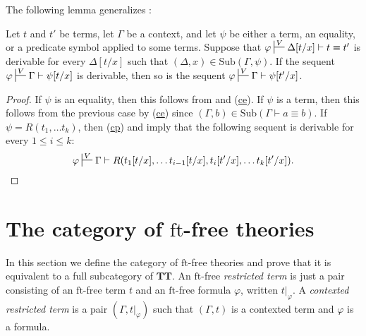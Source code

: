 \documentclass[reqno]{amsart}
\newcommand{\axref}[1]{(\hyperref[ax:#1]{#1})}
\theoremstyle{definition}
\theoremstyle{remark}
\newcommand{\fs}[1]{\mathrm{#1}}
\newcommand{\ft}{\fs{ft}}
\newcommand{\sub}{\fs{Sub}}
\newcommand{\cat}[1]{\mathbf{#1}}
\newcommand{\algtt}{\cat{TT}}
\numberwithin{figure}{section}
\begin{document}
The following lemma generalizes :

\begin{lem}
Let $t$ and $t'$ be terms, let $\Gamma$ be a context, and let $\psi$ be either a term, an equality, or a predicate symbol applied to some terms.
Suppose that $\varphi \sststile{}{V} \Delta[t/x] \vdash t \equiv t'$ is derivable for every $\Delta[t/x]$ such that $(\Delta,x) \in \sub(\Gamma,\psi)$.
If the sequent $\varphi \sststile{}{V} \Gamma \vdash \psi[t/x]$ is derivable, then so is the sequent $\varphi \sststile{}{V} \Gamma \vdash \psi[t'/x]$.
\end{lem}
\begin{proof}
If $\psi$ is an equality, then this follows from  and \axref{ce}.
If $\psi$ is a term, then this follows from the previous case by \axref{ce} since $(\Gamma,b) \in \sub(\Gamma \vdash a \equiv b)$.
If $\psi = R(t_1, \ldots t_k)$, then \axref{cp} and  imply that the following sequent is derivable for every $1 \leq i \leq k$:
\[ \varphi \sststile{}{V} \Gamma \vdash R(t_1[t/x], \ldots t_{i-1}[t/x], t_i[t'/x], \ldots t_k[t'/x]). \]
\end{proof}

\section{The category of $\ft$-free theories}
\label{sec:types}

In this section we define the category of $\ft$-free theories and prove that it is equivalent to a full subcategory of $\algtt$.
An $\ft$-free \emph{restricted term} is just a pair consisting of an $\ft$-free term $t$ and an $\ft$-free formula $\varphi$, written $t|_\varphi$.
A \emph{contexted restricted term} is a pair $(\Gamma,t|_\varphi)$ such that $(\Gamma,t)$ is a contexted term and $\varphi$ is a formula.
\end{document}
